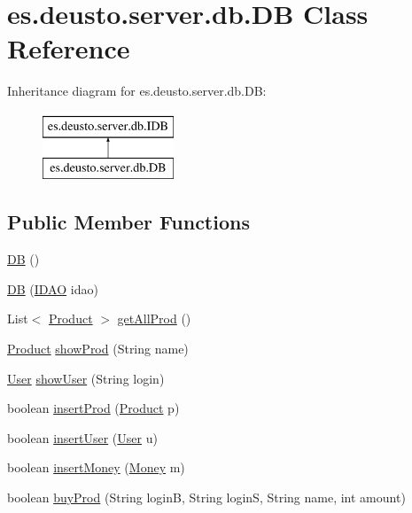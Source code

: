 \hypertarget{classes_1_1deusto_1_1server_1_1db_1_1_d_b}{}\section{es.\+deusto.\+server.\+db.\+DB Class Reference}
\label{classes_1_1deusto_1_1server_1_1db_1_1_d_b}
Inheritance diagram for es.\+deusto.\+server.\+db.\+DB\+:\begin{figure}[H]
\begin{center}
\leavevmode
\includegraphics[height=2.000000cm]{classes_1_1deusto_1_1server_1_1db_1_1_d_b}
\end{center}
\end{figure}
\subsection*{Public Member Functions}
\begin{DoxyCompactItemize}
\item 
\hyperlink{classes_1_1deusto_1_1server_1_1db_1_1_d_b_ab53f32f36928ba9aa3ddff65fce395dc}{DB} ()
\item 
\hyperlink{classes_1_1deusto_1_1server_1_1db_1_1_d_b_a8c85804ab042af947fd1a749ff42fd0d}{DB} (\hyperlink{interfacees_1_1deusto_1_1server_1_1db_1_1dao_1_1_i_d_a_o}{I\+D\+AO} idao)
\item 
List$<$ \hyperlink{classes_1_1deusto_1_1server_1_1db_1_1data_1_1_product}{Product} $>$ \hyperlink{classes_1_1deusto_1_1server_1_1db_1_1_d_b_aa193a59efe6c2458d89fd751da935a3a}{get\+All\+Prod} ()
\item 
\hyperlink{classes_1_1deusto_1_1server_1_1db_1_1data_1_1_product}{Product} \hyperlink{classes_1_1deusto_1_1server_1_1db_1_1_d_b_a1c170a7c91ca5223560b4490738ccf56}{show\+Prod} (String name)
\item 
\hyperlink{classes_1_1deusto_1_1server_1_1db_1_1data_1_1_user}{User} \hyperlink{classes_1_1deusto_1_1server_1_1db_1_1_d_b_ac85523faea523033439a932bbcab2c7e}{show\+User} (String login)
\item 
boolean \hyperlink{classes_1_1deusto_1_1server_1_1db_1_1_d_b_a2f5a50ff22834658b641ebf6bb7afbe6}{insert\+Prod} (\hyperlink{classes_1_1deusto_1_1server_1_1db_1_1data_1_1_product}{Product} p)
\item 
boolean \hyperlink{classes_1_1deusto_1_1server_1_1db_1_1_d_b_a1070e289debd4f0fb5519c245c4e7ed7}{insert\+User} (\hyperlink{classes_1_1deusto_1_1server_1_1db_1_1data_1_1_user}{User} u)
\item 
boolean \hyperlink{classes_1_1deusto_1_1server_1_1db_1_1_d_b_ab9a9acacfc8dadaeec7159c0886dfec2}{insert\+Money} (\hyperlink{classes_1_1deusto_1_1server_1_1db_1_1data_1_1_money}{Money} m)
\item 
boolean \hyperlink{classes_1_1deusto_1_1server_1_1db_1_1_d_b_a06ce3aee905784e5ec88a8945452548e}{buy\+Prod} (String loginB, String loginS, String name, int amount)
\end{DoxyCompactItemize}


